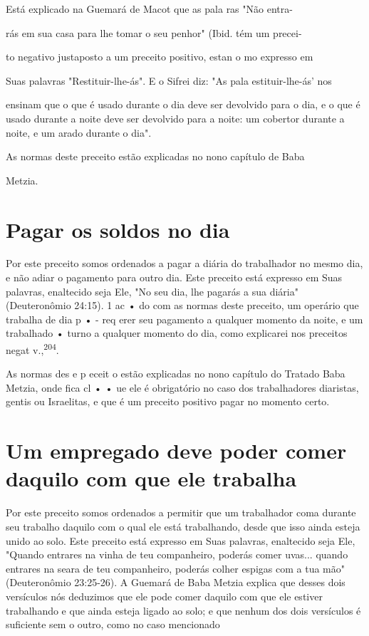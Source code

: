 Está explicado na Guemará de Macot que as pala ras "Não entra-


rás em sua casa para lhe tomar o seu penhor" (Ibid. tém um precei-

to negativo justaposto a um preceito positivo, estan o mo expresso em

Suas palavras "Restituir-lhe-ás". E o Sifrei diz: "As pala
estituir-lhe-ás' nos

ensinam que o que é usado durante o dia deve ser devolvido para o dia, e
o que é usado durante a noite deve ser devolvido para a noite: um
cobertor du­rante a noite, e um arado durante o dia".


As normas deste preceito estão explicadas no nono capítulo de Baba


Metzia.

\section{Pagar os soldos no dia}

Por este preceito somos ordenados a pagar a diária do trabalhador no
mesmo dia, e não adiar o pagamento para outro dia. Este preceito está
ex­presso em Suas palavras, enaltecido seja Ele, "No seu dia, lhe
pagarás a sua diá­ria" (Deuteronômio 24:15). 1 ac • do com as normas
deste preceito, um ope­rário que trabalha de dia p • - req erer seu
pagamento a qualquer momento da noite, e um trabalhado • turno a
qualquer momento do dia, como expli­carei nos preceitos negat
v.,\textsuperscript{204}.

As normas des e p eceit o estão explicadas no nono capítulo do Tra­tado
Baba Metzia, onde fica cl • • ue ele é obrigatório no caso dos
trabalhado­res diaristas, gentis ou Israelitas, e que é um preceito
positivo pagar no momento certo.

\section{Um empregado deve poder comer daquilo com que ele trabalha}

Por este preceito somos ordenados a permitir que um trabalhador coma
durante seu trabalho daquilo com o qual ele está trabalhando, desde que
isso ainda esteja unido ao solo. Este preceito está expresso em Suas
palavras, enaltecido seja Ele, "Quando entrares na vinha de teu
companheiro, poderás comer uvas... quando entrares na seara de teu
companheiro, poderás colher espigas com a tua mão" (Deuteronômio
23:25-26). A Guemará de Baba Metzia explica que desses dois versículos
nós deduzimos que ele pode comer daquilo com que ele estiver trabalhando
e que ainda esteja ligado ao solo; e que ne­nhum dos dois versículos é
suficiente sem o outro, como no caso mencionado


